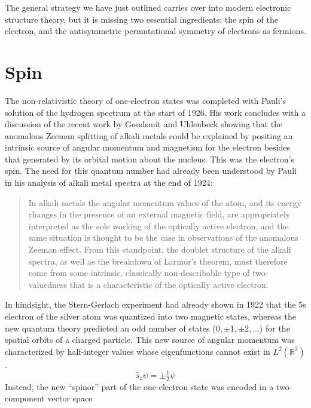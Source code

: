 The general strategy we have just outlined carries over into modern electronic
structure theory, but it is missing two essential ingredients: the spin of the
electron, and the antisymmetric permutational symmetry of electrons as fermions.


\section{Spin}

The non-relativistic theory of one-electron states was completed with Pauli's
solution of the hydrogen spectrum at the start of 1926.\cite{Pauli:1926p336}
His work concludes with a discussion of the recent work by Goudsmit and
Uhlenbeck\cite{Uhlenbeck:1925p953} showing that the anomalous Zeeman splitting
of alkali metals could be explained by positing an intrinsic source of angular
momentum and magnetism for the electron besides that generated by its orbital
motion about the nucleus.
This was the electron's spin.
The need for this quantum number had already been understood by Pauli in his
analysis of alkali metal spectra at the end of 1924:
\begin{quote}
    In alkali metals the angular momentum values of the atom, and its energy
    changes in the presence of an external magnetic field, are appropriately
    interpreted as the sole working of the optically active electron, and the
    same situation is thought to be the case in observations of the anomalous
    Zeeman effect.
    From this standpoint, the doublet structure of the alkali
    spectra, as well as the breakdown of Larmor's theorem, must
    therefore come from some intrinsic, classically non-describable
    type of two-valuedness that is a characteristic of the optically
    active electron.\cite{Pauli:1925p373}
\end{quote}
In hindsight, the Stern-Gerlach experiment\cite{Gerlach:1922p349} had already
shown in 1922 that the 5s electron of the silver atom was quantized into two
magnetic states, whereas the new quantum theory predicted an odd number of
states (\(0, \pm1, \pm2, \dots\)) for the spatial orbits of a charged particle.
This new source of angular momentum was characterized by half-integer values
whose eigenfunctions cannot exist in \(L^2(\mathbb{R}^3)\).
\begin{equation}
    \hat{s}_z
    \psi
    =
    \pm
    \tfrac{1}{2}
    \psi
\end{equation}
Instead, the new ``spinor'' part of the one-electron state was encoded in a
two-component vector space
